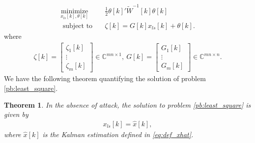 \documentclass[12pt]{article}
\newcommand{\Cb}{{\mathbb{C}}}
\newtheorem{theorem}{\textbf{Theorem}}
\begin{document}
%
%
%
\begin{subequations}\label{pb:least_square}
	\begin{align}
	\underset{{x_{ls}}[k], \theta[k]}{\text{minimize}}&\quad \frac{1}{2} \theta[k]{'} \tilde{W}^{-1}[k] \theta[k]   \\
	\text { subject to}&\quad
	\zeta[k]=
	G[k] x_{ls}[k]+\theta[k] .  
	\end{align}
\end{subequations}
where 
\begin{align*}
\zeta[k]=\begin{bmatrix}
\zeta_1[k] \\ \vdots \\ \zeta_m[k]
\end{bmatrix}\in \Cb^{mn\times 1},\
G[k]=\begin{bmatrix}
G_1[k] \\ \vdots \\ G_m[k]
\end{bmatrix}\in\Cb^{mn\times n}.
\end{align*}
We have the following theorem quantifying the solution of problem \eqref{pb:least_square}.
\begin{theorem}
In the absence of attack, the solution to problem \eqref{pb:least_square} is given by
	\begin{align*}
	x_{ls}[k]=\hat{x}[k],
	\end{align*}
	where $\hat{x}[k]$ is the Kalman estimation defined in \eqref{eq:def_xhat}.
\end{theorem}
\end{document}
